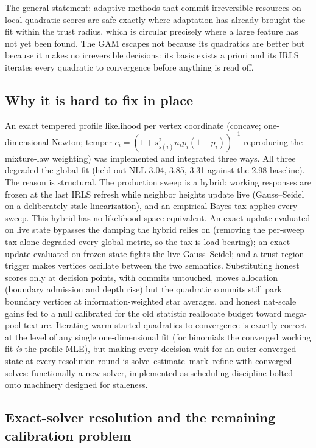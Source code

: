 \documentclass[11pt]{article}
\begin{document}
The general statement: adaptive methods that commit irreversible
resources on local-quadratic scores are safe exactly where adaptation
has already brought the fit within the trust radius, which is circular
precisely where a large feature has not yet been found. The GAM
escapes not because its quadratics are better but because it makes no
irreversible decisions: its basis exists a priori and its IRLS
iterates every quadratic to convergence before anything is read off.

\subsection{Why it is hard to fix in place}

An exact tempered profile likelihood per vertex coordinate (concave;
one-dimensional Newton; temper $c_i = (1+s^2_{s(i)} n_i p_i(1-p_i))^{-1}$
reproducing the mixture-law weighting) was implemented and integrated
three ways. All three degraded the global fit (held-out NLL 3.04,
3.85, 3.31 against the 2.98 baseline). The reason is structural. The
production sweep is a hybrid: working responses are frozen at the last
IRLS refresh while neighbor heights update live (Gauss--Seidel on a
deliberately stale linearization), and an empirical-Bayes tax applies
every sweep. This hybrid has no likelihood-space equivalent. An exact
update evaluated on live state bypasses the damping the hybrid relies
on (removing the per-sweep tax alone degraded every global metric,
so the tax is load-bearing); an exact update evaluated on frozen
state fights the live Gauss--Seidel; and a trust-region trigger makes
vertices oscillate between the two semantics. Substituting honest
scores only at decision points, with commits untouched, moves
allocation (boundary admission and depth rise) but the quadratic
commits still park boundary vertices at information-weighted star
averages, and honest nat-scale gains fed to a null calibrated for the
old statistic reallocate budget toward mega-pool texture. Iterating
warm-started quadratics to convergence is exactly correct at the level
of any single one-dimensional fit (for binomials the converged working
fit \emph{is} the profile MLE), but making every decision wait for an
outer-converged state at every resolution round is
solve--estimate--mark--refine with converged solves: functionally a
new solver, implemented as scheduling discipline bolted onto machinery
designed for staleness.

\subsection{Exact-solver resolution and the remaining calibration problem}
\end{document}
